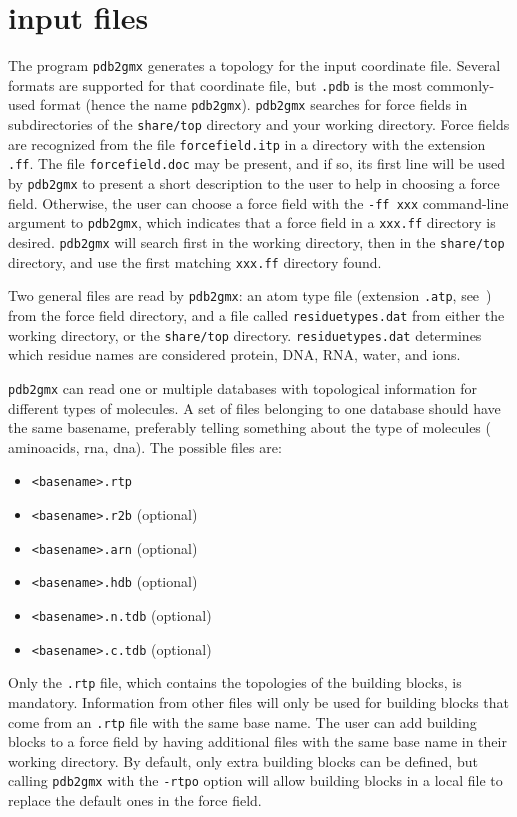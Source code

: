 \section{ input files}
\label{sec:pdb2gmxfiles}
The {\gromacs} program {\tt pdb2gmx} generates a topology for
the input coordinate file. Several formats are supported for
that coordinate file, but {\tt *.pdb} is the most commonly-used format
(hence the name {\tt pdb2gmx}).
{\tt pdb2gmx} searches for force fields in subdirectories of the {\gromacs} {\tt share/top}
directory and your working directory. Force fields are recognized from
the file {\tt forcefield.itp} in a directory with the extension {\tt .ff}.
The file {\tt forcefield.doc} may be present, and if so, its first line
will be used by {\tt pdb2gmx} to present a short description to the
user to help in choosing a force field. Otherwise, the user can
choose a force field with the {\tt -ff xxx} command-line argument
to {\tt pdb2gmx}, which indicates that a force field in a
{\tt xxx.ff} directory is desired. {\tt pdb2gmx} will search first in the
working directory, then in the {\gromacs} {\tt share/top} directory, and
use the first matching {\tt xxx.ff} directory found.

Two general files are read by {\tt pdb2gmx}: an atom type file
(extension {\tt .atp}, see~) from the force field directory,
and a file called {\tt residuetypes.dat} from either the working directory, or
the {\gromacs} {\tt share/top} directory. {\tt residuetypes.dat}
determines which residue names are considered protein, DNA, RNA,
water, and ions.

{\tt pdb2gmx} can read one or multiple databases with topological information
for different types of molecules. A set of files belonging to one database
should have the same basename, preferably telling something about the type
of molecules ({\eg} aminoacids, rna, dna). The possible files are:
\begin{itemize}
\item {\tt <basename>.rtp}
\item {\tt <basename>.r2b} (optional)
\item {\tt <basename>.arn} (optional)
\item {\tt <basename>.hdb} (optional)
\item {\tt <basename>.n.tdb} (optional)
\item {\tt <basename>.c.tdb} (optional)
\end{itemize}
Only the {\tt .rtp} file, which contains the topologies of the building
blocks, is mandatory. Information from other files will only be used 
for building blocks that come from an {\tt .rtp} file with the same base name.
The user can add building blocks to a force field by having additional
files with the same base name in their working directory. By default, only
extra building blocks can be defined, but calling {\tt pdb2gmx} with
the {\tt -rtpo} option will allow building blocks in a local file
to replace the default ones in the force field.


